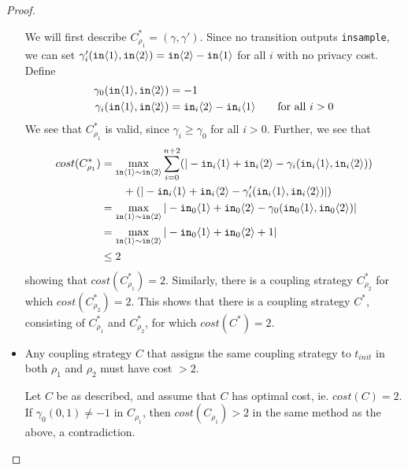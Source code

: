 \begin{proof}
\begin{itemize}
    We will first describe $C_{\rho_1}^* = (\gamma, \gamma')$. Since no transition outputs \texttt{insample}, we can set $\gamma_i'(\texttt{in}\langle1 \rangle, \texttt{in}\langle2 \rangle) = \texttt{in}\langle2 \rangle - \texttt{in}\langle1 \rangle$ for all $i$ with no privacy cost. Define 
    \begin{align*}
        \gamma_0(\texttt{in}\langle1 \rangle, \texttt{in}\langle2 \rangle) &= -1 \\
        \gamma_i(\texttt{in}\langle1 \rangle, \texttt{in}\langle2 \rangle) &= \texttt{in}_i\langle2 \rangle - \texttt{in}_i\langle1 \rangle \qquad \text{for all $i>0$}
    \end{align*}
    We see that $C^*_{\rho_1}$ is valid, since $\gamma_i\geq \gamma_{0}$ for all $i>0$. Further, we see that 
    \begin{align*}
        cost(C^*_{\rho_1}) &= \max_{\texttt{in}\langle1 \rangle\sim\texttt{in}\langle2 \rangle}\sum_{i=0}^{n+2}(|-\texttt{in}_i\langle1 \rangle+\texttt{in}_i\langle2 \rangle-\gamma_i(\texttt{in}_i\langle1 \rangle, \texttt{in}_i\langle2 \rangle))\\&\qquad+(|-\texttt{in}_i\langle1 \rangle+\texttt{in}_i\langle2 \rangle-\gamma_i'(\texttt{in}_i\langle1 \rangle, \texttt{in}_i\langle2 \rangle)|)\\
        &= \max_{\texttt{in}\langle1 \rangle\sim\texttt{in}\langle2 \rangle} |-\texttt{in}_0\langle1 \rangle+\texttt{in}_0\langle2 \rangle-\gamma_0(\texttt{in}_0\langle1 \rangle, \texttt{in}_0\langle2 \rangle)| \\
        &= \max_{\texttt{in}\langle1 \rangle\sim\texttt{in}\langle2 \rangle} |-\texttt{in}_0\langle1 \rangle+\texttt{in}_0\langle2 \rangle+1|\\
        &\leq 2 
    \end{align*}
    showing that $cost(C^*_{\rho_1}) = 2$. Similarly, there is a coupling strategy $C^*_{\rho_2}$ for which $cost(C^*_{\rho_2}) = 2$. This shows that there is a coupling strategy $C^*$, consisting of $C^*_{\rho_1}$ and $C^*_{\rho_2}$, for which $cost(C^*) = 2$.
    
    \item Any coupling strategy $C$ that assigns the same coupling strategy to $t_{init}$ in both $\rho_1$ and $\rho_2$ must have cost $>2$.
    
    Let $C$ be as described, and assume that $C$ has optimal cost, ie. $cost(C) = 2$. If $\gamma_0(0, 1) \neq -1$ in $C_{\rho_1}$, then $cost(C_{\rho_1}) > 2$ in the same method as the above, a contradiction.  


\end{itemize}
\end{proof}

